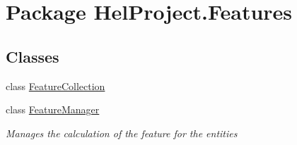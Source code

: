 \hypertarget{namespace_hel_project_1_1_features}{}\section{Package Hel\+Project.\+Features}
\label{namespace_hel_project_1_1_features}
\subsection*{Classes}
\begin{DoxyCompactItemize}
\item 
class \hyperlink{class_hel_project_1_1_features_1_1_feature_collection}{Feature\+Collection}
\item 
class \hyperlink{class_hel_project_1_1_features_1_1_feature_manager}{Feature\+Manager}
\begin{DoxyCompactList}\small\item\em Manages the calculation of the feature for the entities \end{DoxyCompactList}\end{DoxyCompactItemize}
